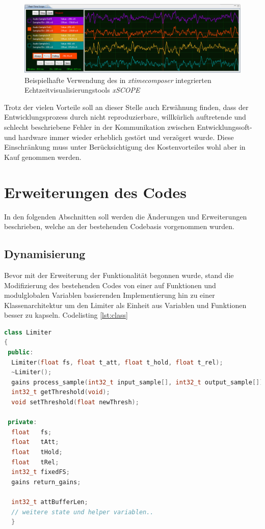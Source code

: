 \documentclass[paper=a4, fontsize=12pt]{scrartcl}
\numberwithin{equation}{section}		%
\numberwithin{figure}{section}			%
\numberwithin{table}{section}				%
\begin{document}
\begin{figure}[htb]
  \centering
  \label{fig:xscope}
  \includegraphics[width=01.0\textwidth]{graphics/xscope.jpg}
  \caption{Beispielhafte Verwendung des in \textit{xtimecomposer} integrierten Echtzeitvisualisierungstools \textit{xSCOPE}}
\end{figure}

Trotz der vielen Vorteile soll an dieser Stelle auch Erwähnung finden, dass der Entwicklungsprozess durch nicht reproduzierbare, willkürlich auftretende und schlecht beschriebene Fehler in der Kommunikation zwischen Entwicklungssoft- und hardware immer wieder erheblich gestört und verzögert wurde. Diese Einschränkung muss unter Berücksichtigung des Kostenvorteiles wohl aber in Kauf genommen werden.

\section{Erweiterungen des Codes}
In den folgenden Abschnitten soll werden die Änderungen und Erweiterungen beschrieben, welche an der bestehenden Codebasis vorgenommen wurden. 

\subsection{Dynamisierung}
Bevor mit der Erweiterung der Funktionalität begonnen wurde, stand die Modifizierung des bestehenden Codes von einer auf Funktionen und modulglobalen Variablen basierenden Implementierung hin zu einer Klassenarchitektur um den Limiter als Einheit aus Variablen und Funktionen besser zu kapseln. Codelisting \ref{lst:class}

\begin{lstlisting}[language=C++, caption={Klassenstruktur der Limiterklasse},label=lst:class,]
class Limiter
{
 public:
  Limiter(float fs, float t_att, float t_hold, float t_rel);
  ~Limiter();
  gains process_sample(int32_t input_sample[], int32_t output_sample[]);
  int32_t getThreshold(void);
  void setThreshold(float newThresh);

 private:
  float   fs;
  float   tAtt;
  float   tHold;
  float   tRel;
  int32_t fixedFS;
  gains return_gains;

  int32_t attBufferLen;
  // weitere state und helper variablen..
  }

\end{lstlisting}
\end{document}
